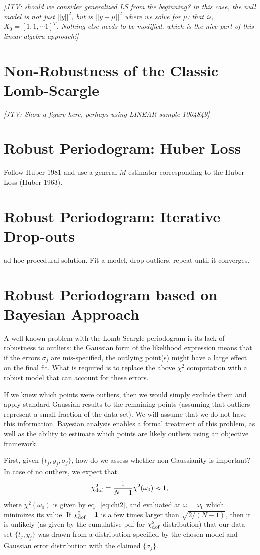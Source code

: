 \documentclass[12pt,pdftex]{article}
\newcommand{\jake}[1]{{\color{blue}\it[JTV: #1]}}
\begin{document}
\jake{should we consider generalized LS from the beginning? in this case, the null model is not just $||y||^2$, but is $||y - \mu||^2$ where we solve for $\mu$: that is, $X_0 = [1, 1, \cdots 1]^T$. Nothing else needs to be modified, which is the nice part of this linear algebra approach!}

\section{Non-Robustness of the Classic Lomb-Scargle}

\jake{Show a figure here, perhaps using LINEAR sample 1004849}

\section{Robust Periodogram: Huber Loss}
Follow Huber 1981 and use a general $M$-estimator corresponding to the Huber Loss (Huber 1963).

\section{Robust Periodogram: Iterative Drop-outs}
ad-hoc procedural solution. Fit a model, drop outliers, repeat until it converges.


\section{Robust Periodogram based on Bayesian Approach}

A well-known problem with the Lomb-Scargle periodogram is its lack of robustness to outliers: the Gaussian form of the likelihood expression means that if the errors $\sigma_j$ are mis-specified, the outlying point(s) might have a large effect on the final fit. 
What is required is to replace the above $\chi^2$ computation with a robust model that can account for these errors.

If we knew which points were outliers, then we would simply exclude them and
apply standard Gaussian results to the remaining points (assuming that outliers
represent a small fraction of the data set). We will assume that we do not have this
information. Bayesian analysis enables a formal treatment of this problem, as well 
as the ability to estimate which points are likely outliers using an objective framework.

First, given $\{t_j, y_j, \sigma_j\}$, how do we assess whether non-Gaussianity is important? 
In case of no outliers, we expect that
\begin{equation}
           \chi^2_{\rm dof} = {1 \over N-1} \chi^2(\omega_0) \approx 1,
\end{equation}
where $\chi^2(\omega_0)$ is given by eq.~\ref{eq:chi2}, and evaluated at $\omega=\omega_0$ which
minimizes its value. If $\chi^2_{\rm dof}-1$ is a few times larger than $\sqrt{2/(N-1)}$, then it is unlikely
(as given by the cumulative pdf for $\chi^2_{\rm dof}$ distribution) that our data set $\{t_j, y_j\}$ was 
drawn from a distribution specified by the chosen model and Gaussian error distribution with 
the claimed $\{\sigma_j\}$.
\end{document}

